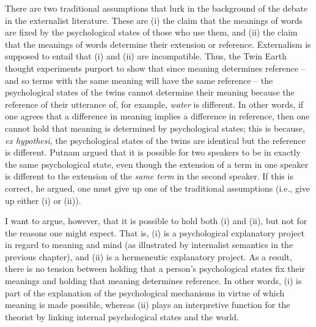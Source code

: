 There are two traditional assumptions that lurk in the background of the debate in the externalist literature. These are (i) the claim that the meanings of words are fixed by the psychological states of those who use them, and (ii) the claim that the meanings of words determine their extension or reference. Externalism is supposed to entail that (i) and (ii) are incompatible. Thus, the Twin Earth thought experiments purport to show that since meaning determines reference – and so terms with the same meaning will have the same reference – the psychological states of the twins cannot determine their meaning because the reference of their utterance of, for example, \textit{water} is different. In other words, if one agrees that a difference in meaning implies a difference in reference, then one cannot hold that meaning is determined by psychological states; this is because, \textit{ex hypothesi}, the psychological states of the twins are identical but the reference is different. Putnam argued that it is possible for two speakers to be in exactly the same psychological state, even though the extension of a term in one speaker is different to the extension of the \textit{same term} in the second speaker. If this is correct, he argued, one must give up one of the traditional assumptions (i.e., give up either (i) or (ii)).

I want to argue, however, that it is possible to hold both (i) and (ii), but not for the reasons one might expect. That is, (i) is a psychological explanatory project in regard to meaning and mind (as illustrated by internalist semantics in the previous chapter), and (ii) is a hermeneutic explanatory project. As a result, there is no tension between holding that a person’s psychological states fix their meanings and holding that meaning determines reference. In other words, (i) is part of the explanation of the psychological mechanisms in virtue of which meaning is made possible, whereas (ii) plays an interpretive function for the theorist by linking internal psychological states and the world.

